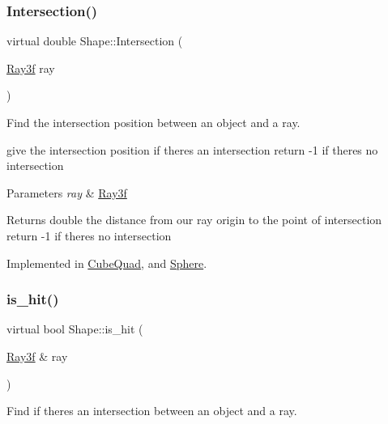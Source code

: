 \subsubsection{\texorpdfstring{Intersection()}{Intersection()}}
{\footnotesize\ttfamily virtual double Shape\+::\+Intersection (\begin{DoxyParamCaption}\item[{\mbox{\hyperlink{class_ray3f}{Ray3f}}}]{ray }\end{DoxyParamCaption})\hspace{0.3cm}{\ttfamily [pure virtual]}}



Find the intersection position between an object and a ray. 

give the intersection position if there\textquotesingle{}s an intersection return -\/1 if there\textquotesingle{}s no intersection 
\begin{DoxyParams}{Parameters}
{\em ray} & \mbox{\hyperlink{class_ray3f}{Ray3f}} \\
\hline
\end{DoxyParams}
\begin{DoxyReturn}{Returns}
double the distance from our ray origin to the point of intersection return -\/1 if there\textquotesingle{}s no intersection 
\end{DoxyReturn}


Implemented in \mbox{\hyperlink{class_cube_quad_a3b51f8216f2ba340174edb542af33c0a}{Cube\+Quad}}, and \mbox{\hyperlink{class_sphere_af9c784cb35851974251e1585e3717dd9}{Sphere}}.

\mbox{\label{class_shape_ab443b81b74cfb1d248d23cc049da7ddd}} 
\subsubsection{\texorpdfstring{is\+\_\+hit()}{is\_hit()}}
{\footnotesize\ttfamily virtual bool Shape\+::is\+\_\+hit (\begin{DoxyParamCaption}\item[{\mbox{\hyperlink{class_ray3f}{Ray3f}} \&}]{ray }\end{DoxyParamCaption})\hspace{0.3cm}{\ttfamily [pure virtual]}}



Find if there\textquotesingle{}s an intersection between an object and a ray. 

